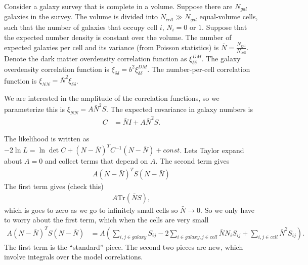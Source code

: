 \documentclass{aastex62}   	%
\begin{document}
Consider a galaxy survey that is complete in a volume.  Suppose there are $N_{gal}$ galaxies in the survey.  The volume is divided into $N_{cell} \gg N_{gal}$
equal-volume cells, such that the number of galaxies that occupy cell $i$, $N_i=0$ or $1$.  Suppose that the expected number density is constant over the volume.
The number of expected galaxies per cell and its variance (from Poisson statistics) is $\bar{N} = \frac{N_{\text{gal}}}{N_{\text{cell}}}$.  
Denote the dark matter overdensity correlation function as $\xi^{DM}_{\delta \delta}$. The galaxy overdensity correlation function is
$\xi_{\delta \delta} =  b^2 \xi^{DM}_{\delta \delta}$.  The number-per-cell correlation function 
is $\xi_{NN}  =\bar{N}^2 \xi_{\delta \delta}$.

We are interested in the amplitude of the correlation functions, so we parameterize
 this is $\xi_{NN} =A\bar{N}^2S$.
The expected covariance in galaxy numbers is
\begin{align*}
C &= \bar{N} I + A\bar{N}^2S.
\end{align*}

The likelihood is written as $-2\ln{L} = \ln{\det{C}} + (N-\bar{N})^T C^{-1}(N-\bar{N}) + const$.   Lets Taylor expand about $A=0$ and collect terms that
depend on $A$.  The second term gives
\begin{align*}
A (N-\bar{N})^T S(N-\bar{N})
\end{align*}
The first term gives (check this)
\begin{align*}
A\text{Tr}(\bar{N}S),
\end{align*}
which is goes to zero as we go to infinitely small cells so $\bar{N} \rightarrow 0$.  So we only have to worry about the first term, which when the
cells are very small
\begin{align*}
A (N-\bar{N})^T S(N-\bar{N}) &= A \left( \sum_{i,j \in {galaxy}} S_{ij} -2 \sum_{i \in {galaxy}, j\in {cell}} \bar{N}N_i S_{ij}  +  \sum_{ i,j\in {cell}}  \bar{N}^2 S_{ij}\right).
\end{align*}
The first term is the ``standard'' piece.  The second two pieces are new, which involve integrals over the model correlations.
\end{document}

